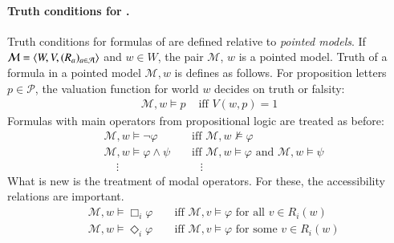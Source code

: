 \documentclass[nobib,nofonts]{tufte-handout}
\renewcommand{\phi}{\ensuremath{\varphi}}
\newcommand{\Model}{\ensuremath{\mathcal{M}}}
\newcommand{\modlog}{\acro{ModLog}}
\begin{document}


\paragraph{Truth conditions for \modlog.}
Truth conditions for formulas of \modlog are defined relative to \emph{pointed models}.
If $\Model = \tuple{W,V,(R_a)_{a \in \mathcal{A}}}$ and $w \in W$, the pair $\Model$, $w$ is a pointed model.
Truth of a formula in a pointed model $\Model,w$ is defines as follows.
For proposition letters $p \in \mathcal{P}$, the valuation function for world $w$ decides on truth or falsity:
%
\begin{align*}
  \Model, w \models p & \text{ \ iff \  } V(w,p) = 1
\end{align*}
%
Formulas with main operators from propositional logic are treated as before:
%
\begin{align*}
  &\Model, w \models \neg \phi && \text{ \ iff \ } \Model, w \not \models \phi \\
  &\Model, w \models \phi \wedge \psi && \text{ \ iff \ } \Model, w \models \phi \text{ \ and \ } \Model, w \models \psi \\
  & \ \ \ \ \  \vdots && \ \ \ \ \ \vdots
\end{align*}
%
What is new is the treatment of modal operators.
For these, the accessibility relations are important.
%
\begin{align*}
    & \Model, w \models \Box_i \phi & & \text{ \ iff \ } \Model, v \models
    \phi \text{ for all $v \in R_i(w)$} \\
    & \Model, w \models \Diamond_i \phi & & \text{ \ iff \ } \Model, v
    \models \phi \text{ \ for some $v \in R_i(w)$}
\end{align*}
\end{document}
